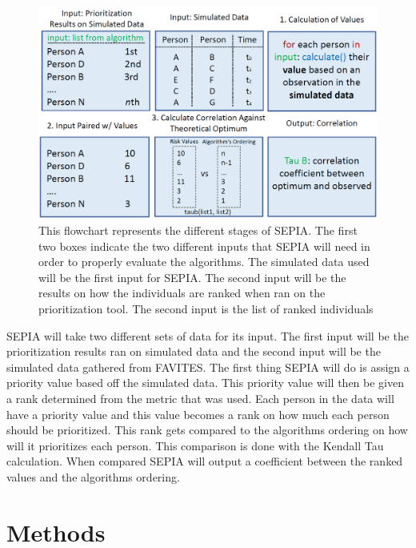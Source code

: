 \documentclass[twocolumn]{bmcart}%
\begin{document}
\begin{multicols}
\begin{figure}
\centering
\includegraphics[scale=0.28]{Figures/SEPIA workflow.png}
\caption{This flowchart represents the different stages of SEPIA. The first two boxes indicate the two different inputs that SEPIA will need in order to properly evaluate the algorithms. The simulated data used will be the first input for SEPIA. The second input will be the results on how the individuals are ranked when ran on the prioritization tool. The second input is the list of ranked individuals}
\end{figure}

SEPIA will take two different sets of data for its input. The first input will be the prioritization results ran on simulated data and the  second input will be the simulated data gathered from FAVITES. The first thing SEPIA will do is assign a priority value based off the simulated data. This priority value will then be given a rank determined from the metric that was used. Each person in the data will have a priority value and this value becomes a rank on how much each person should be prioritized. This rank gets compared to the algorithms ordering on how will it prioritizes each person. This comparison is done with the Kendall Tau calculation. When compared SEPIA will output a coefficient between the ranked values and the algorithms ordering.

\section*{Methods}


\end{multicols}
\end{document}
